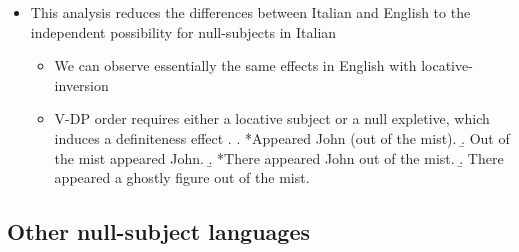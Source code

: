 \documentclass[letterpaper,10pt]{handout_nick}
\begin{document}
\begin{itemize}
\begin{itemize}
\item Observation 2: if LOC and DP arguments are overt, one must move to satisfy EPP\footnote{Norvin Richards (p.c.) suggests that this might have an explanation along the lines of Moro's ``dynamic antisymmetry,'' e.g., movement is forced because the VP cannot host two overt arguments. Observation 3 should be sufficient to rule this out, since both arguments can remain \emph{in situ} if the DP is non-specific.}
\ex. \a. [$_\text{TP}$ LOC [T \ldots [V DP]]] \hfill ($\checkmark$ EPP)
\b. [$_\text{TP}$ DP [T \ldots [V LOC]]] \hfill ($\checkmark$ EPP) 
\b. [$_\text{TP}$ $\emptyset$ [T \ldots [V DP LOC]]] \hfill (\xmark\ EPP) 

\item Observation 3: alternatively, we can insert a (null) oblique expletive to satisfy EPP, diagnosed by the presence of a characteristic definiteness effect\footnote{We make the prediction, which I have so far been unable to test, that V-DP orders should allow a non-speaker oriented interpretation if the DP is non-specific, since in this case we can use an expletive instead of a locative.} 
\ex. [$_\text{TP}$  [T \ldots [V DP$_\SC{ns}$ LOC]]] \hfill ($\checkmark$ EPP, $\checkmark$ definiteness effect)

\end{itemize}
\item This analysis reduces the differences between Italian and English to the independent possibility for null-subjects in Italian
\begin{itemize}
\item We can observe essentially the same effects in English with locative-inversion
\item V-DP order requires either a locative subject or a null expletive, which induces a definiteness effect
\ex. \a. *Appeared John (out of the mist).
\b. Out of the mist appeared John.
\b. *There appeared John out of the mist.
\b. There appeared a ghostly figure out of the mist.

\end{itemize}
\end{itemize}
\subsection{Other null-subject languages}
\end{document}
